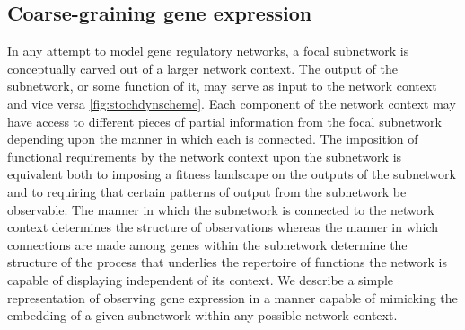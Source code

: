 \subsection{Coarse-graining gene expression}
In any attempt to model gene regulatory networks, a focal subnetwork is conceptually carved out of a larger network context. The output of the subnetwork, or some function of it, may serve as input to the network context and vice versa \ref{fig:stochdynscheme}. Each component of the network context may have access to different pieces of partial information from the focal subnetwork depending upon the manner in which each is connected. The imposition of functional requirements by the network context upon the subnetwork is equivalent both to imposing a fitness landscape on the outputs of the subnetwork and to requiring that certain patterns of output from the subnetwork be observable. The manner in which the subnetwork is connected to the network context determines the structure of observations whereas the manner in which connections are made among genes within the subnetwork determine the structure of the process that underlies the repertoire of functions the network is capable of displaying independent of its context. We describe a simple representation of observing gene expression in a manner capable of mimicking the embedding of a given subnetwork within any possible network context.

